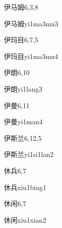 \begin{entry}{伊马姆}{6,3,8}
  \begin{phonetics}{伊马姆}{yi1ma3mu3}
  \end{phonetics}
\end{entry}

\begin{entry}{伊玛目}{6,7,5}
  \begin{phonetics}{伊玛目}{yi1ma3mu4}
  \end{phonetics}
\end{entry}

\begin{entry}{伊朗}{6,10}
  \begin{phonetics}{伊朗}{yi1lang3}
  \end{phonetics}
\end{entry}

\begin{entry}{伊曼}{6,11}
  \begin{phonetics}{伊曼}{yi1man4}
  \end{phonetics}
\end{entry}

\begin{entry}{伊斯兰}{6,12,5}
  \begin{phonetics}{伊斯兰}{yi1si1lan2}
  \end{phonetics}
\end{entry}

\begin{entry}{休兵}{6,7}
  \begin{phonetics}{休兵}{xiu1bing1}
  \end{phonetics}
\end{entry}

\begin{entry}{休闲}{6,7}
  \begin{phonetics}{休闲}{xiu1xian2}
  \end{phonetics}
\end{entry}

